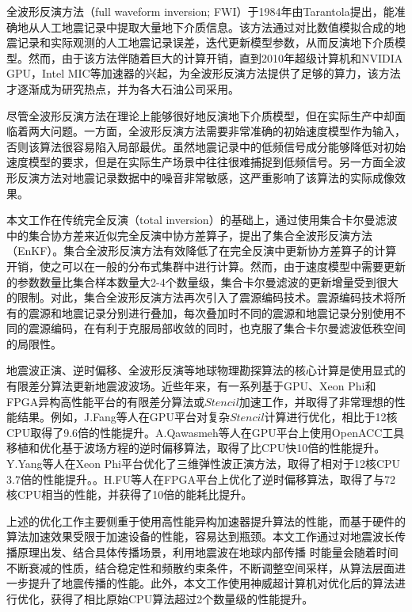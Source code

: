 \documentclass[degree=doctor]{thuthesis}
\begin{document}
全波形反演方法（full waveform inversion; FWI）于1984年由Tarantola提出，能准确地从人工地震记录中提取大量地下介质信息\cite{tarantola1984inversion,plessix2012full,brossier2009seismic}。该方法通过对比数值模拟合成的地震记录和实际观测的人工地震记录误差，迭代更新模型参数，从而反演地下介质模型\cite{yushu}。然而，由于该方法伴随着巨大的计算开销，直到2010年超级计算机和NVIDIA GPU，Intel MIC等加速器的兴起，为全波形反演方法提供了足够的算力，该方法才逐渐成为研究热点，并为各大石油公司采用。

尽管全波形反演方法在理论上能够很好地反演地下介质模型，但在实际生产中却面临着两大问题。一方面，全波形反演方法需要非常准确的初始速度模型作为输入，否则该算法很容易陷入局部最优\cite{virieux2009overview}。虽然地震记录中的低频信号成分能够降低对初始速度模型的要求，但是在实际生产场景中往往很难捕捉到低频信号\cite{sirgue2006importance}。另一方面全波形反演方法对地震记录数据中的噪音非常敏感，这严重影响了该算法的实际成像效果。

本文工作在传统完全反演\cite{tarantola1982generalized}（total inversion）的基础上，通过使用集合卡尔曼滤波\cite{evensen2003ensemble}中的集合协方差来近似完全反演中协方差算子，提出了集合全波形反演方法（EnKF）\cite{yushu,he2015ensemble}。集合全波形反演方法有效降低了在完全反演中更新协方差算子的计算开销，使之可以在一般的分布式集群中进行计算。然而，由于速度模型中需要更新的参数数量比集合样本数量大2-4个数量级，集合卡尔曼滤波的更新增量受到很大的限制。对此，集合全波形反演方法再次引入了震源编码技术\cite{krebs2009fast}。震源编码技术将所有的震源和地震记录分别进行叠加，每次叠加时不同的震源和地震记录分别使用不同的震源编码，在有利于克服局部收敛的同时\cite{castellanos2014fast}，也克服了集合卡尔曼滤波低秩空间的局限性。


地震波正演、逆时偏移、全波形反演等地球物理勘探算法的核心计算是使用显式的有限差分算法更新地震波波场。近些年来，有一系列基于GPU、Xeon Phi和FPGA异构高性能平台的有限差分算法或$Stencil$加速工作，并取得了非常理想的性能结果\cite{qawasmeh2015gpu,martinez2015towards,fang2015optimizing,liu20153d,clapp2015seismic,costa2015half,fu2012revisiting,clapp2010selecting}。例如，J.Fang等人在GPU平台对复杂$Stencil$计算进行优化，相比于12核CPU取得了9.6倍的性能提升\cite{fang2015optimizing}。A.Qawasmeh等人在GPU平台上使用OpenACC工具移植和优化基于波场方程的逆时偏移算法，取得了比CPU快10倍的性能提升\cite{qawasmeh2015gpu}。Y.Yang等人在Xeon Phi平台优化了三维弹性波正演方法，取得了相对于12核CPU 3.7倍的性能提升。\cite{you2013accelerating}。H.FU等人在FPGA平台上优化了逆时偏移算法，取得了与72核CPU相当的性能，并获得了10倍的能耗比提升。

上述的优化工作主要侧重于使用高性能异构加速器提升算法的性能，而基于硬件的算法加速效果受限于加速设备的性能，容易达到瓶颈。本文工作通过对地震波长传播原理出发、结合具体传播场景，利用地震波在地球内部传播 时能量会随着时间不断衰减的性质，结合稳定性和频散约束条件，不断调整空间采样，从算法层面进一步提升了地震传播的性能。此外，本文工作使用神威超计算机对优化后的算法进行优化，获得了相比原始CPU算法超过2个数量级的性能提升。
\end{document}
